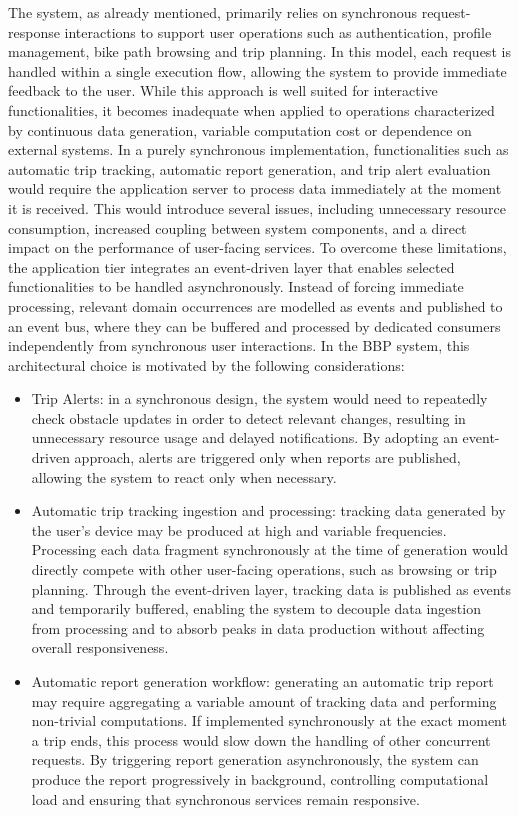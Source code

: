 The system, as already mentioned, primarily relies on synchronous request-response interactions to support user operations such as authentication, profile management, bike path browsing and trip planning. In this model, each request is handled within a single execution flow, allowing the system to provide immediate feedback to the user. While this approach is well suited for interactive functionalities, it becomes inadequate when applied to operations characterized by continuous data generation, variable computation cost or dependence on external systems. In a purely synchronous implementation, functionalities such as automatic trip tracking, automatic report generation, and trip alert evaluation would require the application server to process data immediately at the moment it is received. This would introduce several issues, including unnecessary resource consumption, increased coupling between system components, and a direct impact on the performance of user-facing services. To overcome these limitations, the application tier integrates an event-driven layer that enables selected functionalities to be handled asynchronously. Instead of forcing immediate processing, relevant domain occurrences are modelled as events and published to an event bus, where they can be buffered and processed by dedicated consumers independently from synchronous user 
interactions. In the BBP system, this architectural choice is motivated by the following considerations:
\begin{itemize}
    \item Trip Alerts: in a synchronous design, the system would need to repeatedly check obstacle updates in order to detect relevant changes, resulting in unnecessary resource usage and delayed notifications. By adopting an event-driven approach, alerts are triggered only when reports are published, allowing the system to react only when necessary.
    \item Automatic trip tracking ingestion and processing: tracking data generated by the user's device may be produced at high and variable frequencies. Processing each data fragment synchronously at the time of generation would directly compete with other user-facing operations, such as browsing or trip planning. Through the event-driven layer, tracking data is published as events and temporarily buffered, enabling the system to decouple data ingestion from processing and to absorb peaks in data production without affecting overall responsiveness.
    \item Automatic report generation workflow: generating an automatic trip report may require aggregating a variable amount of tracking data and performing non-trivial computations. If implemented synchronously at the exact moment a trip ends, this process would slow down the handling of other concurrent requests. By triggering report generation asynchronously, the system can produce the report progressively in background, controlling computational load and ensuring that synchronous services remain responsive.
\end{itemize}

